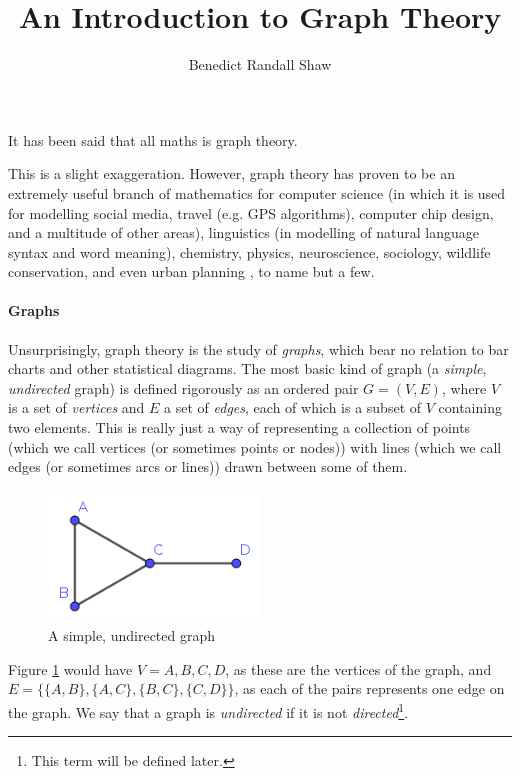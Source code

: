 \documentclass{article}
\title{An Introduction to Graph Theory}
\author{Benedict Randall Shaw}
\begin{document}
	\maketitle
	
	It has been said that all maths is graph theory.
	
	This is a slight exaggeration. However, graph theory has proven to be an extremely useful branch of mathematics for computer science (in which it is used for modelling social media, travel (e.g. GPS algorithms), computer chip design, and a multitude of other areas), linguistics (in modelling of natural language syntax and word meaning), chemistry, physics, neuroscience, sociology, wildlife conservation, and even urban planning \cite{acityisnotatree}, to name but a few.

	\paragraph{Graphs}
	
	Unsurprisingly, graph theory is the study of \textit{graphs}, which bear no relation to bar charts and other statistical diagrams. The most basic kind of graph (a \textit{simple}, \textit{undirected} graph) is defined rigorously as an ordered pair \(G=(V,E)\), where \(V\) is a set of \textit{vertices} and \(E\) a set of \textit{edges}, each of which is a subset of \(V\) containing two elements. This is really just a way of representing a collection of points (which we call vertices (or sometimes points or nodes)) with lines (which we call edges (or sometimes arcs or lines)) drawn between some of them.
	
	\begin{figure}[h]
		\centering
		\includegraphics[width=0.5\textwidth]{simplegraph}
		\caption{A simple, undirected graph}
		\label{simplegraph}
	\end{figure}
	
	Figure \ref{simplegraph} would have \(V={A,B,C,D}\), as these are the vertices of the graph, and \(E=\{\{A,B\},\{A,C\},\{B,C\},\{C,D\}\}\), as each of the pairs represents one edge on the graph. We say that a graph is \textit{undirected} if it is not \textit{directed}\footnote{This term will be defined later.\label{definedlater}}.
	
\end{document}

